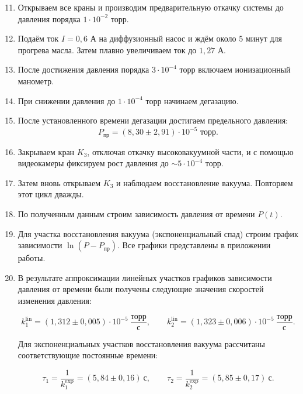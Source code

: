 \documentclass[a4paper,12pt]{article}
\begin{document}
\begin{enumerate}
    \setcounter{enumi}{10}
    \item Открываем все краны и производим предварительную откачку системы до давления порядка $1 \cdot 10^{-2}$ торр.

    \item Подаём ток $I = 0{,}6$ А на диффузионный насос и ждём около 5 минут для прогрева масла. Затем плавно увеличиваем ток до $1{,}27$ А.
    
    \item После достижения давления порядка $3 \cdot 10^{-4}$ торр включаем ионизационный манометр.
    
    \item При снижении давления до $1 \cdot 10^{-4}$ торр начинаем дегазацию.
    
    \item После установленного времени дегазации достигаем предельного давления:
    \[
        P_{\text{пр}} = (8{,}30 \pm 2{,}91) \cdot 10^{-5} \text{ торр}.
    \]
    
    \item Закрываем кран $K_3$, отключая откачку высоковакуумной части, и с помощью видеокамеры фиксируем рост давления до $\sim 5 \cdot 10^{-4}$ торр.
    
    \item Затем вновь открываем $K_3$ и наблюдаем восстановление вакуума. Повторяем этот цикл дважды.
    
    \item По полученным данным строим зависимость давления от времени $P(t)$.
    
    \item Для участка восстановления вакуума (экспоненциальный спад) строим график зависимости $\ln(P - P_{\text{пр}})$. Все графики представлены в приложении работы.

    \item В результате аппроксимации линейных участков графиков зависимости давления от времени были получены следующие значения скоростей изменения давления:
    
    \[
        k_1^{\text{lin}} = (1{,}312 \pm 0{,}005) \cdot 10^{-5} \ \frac{\text{торр}}{\text{с}}, \qquad
        k_2^{\text{lin}} = (1{,}323 \pm 0{,}006) \cdot 10^{-5} \ \frac{\text{торр}}{\text{с}}.
    \]
    
    Для экспоненциальных участков восстановления вакуума рассчитаны соответствующие постоянные времени:
    
    \[
        \tau_1 = \frac{1}{k_1^{\text{exp}}} = (5{,}84 \pm 0{,}16) \ \text{с}, \qquad
        \tau_2 = \frac{1}{k_2^{\text{exp}}} = (5{,}85 \pm 0{,}17) \ \text{с}.
    \]
    

\end{enumerate}
\end{document}
